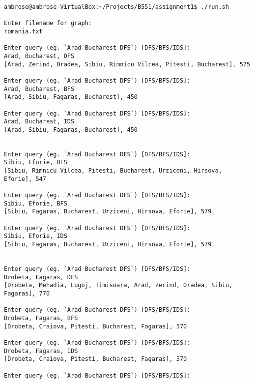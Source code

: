 \documentclass[10pt]{article}
\begin{document}
\begin{verbatim}
ambrose@ambrose-VirtualBox:~/Projects/B551/assignment1$ ./run.sh 

Enter filename for graph:
romania.txt

Enter query (eg. `Arad Bucharest DFS`) [DFS/BFS/IDS]:
Arad, Bucharest, DFS
[Arad, Zerind, Oradea, Sibiu, Rimnicu Vilcea, Pitesti, Bucharest], 575

Enter query (eg. `Arad Bucharest DFS`) [DFS/BFS/IDS]:
Arad, Bucharest, BFS
[Arad, Sibiu, Fagaras, Bucharest], 450

Enter query (eg. `Arad Bucharest DFS`) [DFS/BFS/IDS]:
Arad, Bucharest, IDS
[Arad, Sibiu, Fagaras, Bucharest], 450


Enter query (eg. `Arad Bucharest DFS`) [DFS/BFS/IDS]:
Sibiu, Eforie, DFS
[Sibiu, Rimnicu Vilcea, Pitesti, Bucharest, Urziceni, Hirsova, Eforie], 547

Enter query (eg. `Arad Bucharest DFS`) [DFS/BFS/IDS]:
Sibiu, Eforie, BFS
[Sibiu, Fagaras, Bucharest, Urziceni, Hirsova, Eforie], 579

Enter query (eg. `Arad Bucharest DFS`) [DFS/BFS/IDS]:
Sibiu, Eforie, IDS
[Sibiu, Fagaras, Bucharest, Urziceni, Hirsova, Eforie], 579


Enter query (eg. `Arad Bucharest DFS`) [DFS/BFS/IDS]:
Drobeta, Fagaras, DFS
[Drobeta, Mehadia, Lugoj, Timisoara, Arad, Zerind, Oradea, Sibiu, Fagaras], 770

Enter query (eg. `Arad Bucharest DFS`) [DFS/BFS/IDS]:
Drobeta, Fagaras, BFS
[Drobeta, Craiova, Pitesti, Bucharest, Fagaras], 570

Enter query (eg. `Arad Bucharest DFS`) [DFS/BFS/IDS]:
Drobeta, Fagaras, IDS
[Drobeta, Craiova, Pitesti, Bucharest, Fagaras], 570

Enter query (eg. `Arad Bucharest DFS`) [DFS/BFS/IDS]:

\end{verbatim}
\end{document}
